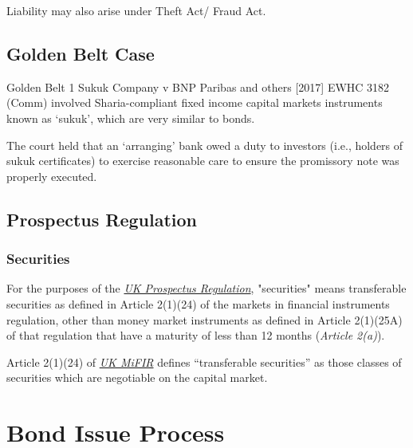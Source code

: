 \documentclass[
]{article}
\begin{document}
Liability may also arise under Theft Act/ Fraud Act.

\hypertarget{golden-belt-case}{%
\subsection{Golden Belt Case}\label{golden-belt-case}}

Golden Belt 1 Sukuk Company v BNP Paribas and others {[}2017{]} EWHC
3182 (Comm) involved Sharia-compliant fixed income capital markets
instruments known as `sukuk', which are very similar to bonds.

The court held that an `arranging' bank owed a duty to investors (i.e.,
holders of sukuk certificates) to exercise reasonable care to ensure the
promissory note was properly executed.

\hypertarget{prospectus-regulation}{%
\subsection{Prospectus Regulation}\label{prospectus-regulation}}

\hypertarget{securities}{%
\subsubsection{Securities}\label{securities}}

For the purposes of the
\emph{\href{https://uk.westlaw.com/w-028-7820?originationContext=document\&transitionType=PLDocumentLink\&contextData=(sc.Default)\&ppcid=20e13a611e13444ebce3d0cd9aea3960}{UK
Prospectus Regulation}}, "securities" means transferable securities as
defined in Article 2(1)(24) of the markets in financial instruments
regulation, other than money market instruments as defined in Article
2(1)(25A) of that regulation that have a maturity of less than 12 months
(\emph{Article 2(a)}).

Article 2(1)(24) of
\emph{\href{https://uk.westlaw.com/w-028-5575?originationContext=document\&transitionType=PLDocumentLink\&contextData=(sc.Default)\&ppcid=20e13a611e13444ebce3d0cd9aea3960}{UK
MiFIR}} defines ``transferable securities'' as those classes of
securities which are negotiable on the capital market.

\hypertarget{bond-issue-process}{%
\section{Bond Issue Process}\label{bond-issue-process}}
\end{document}
